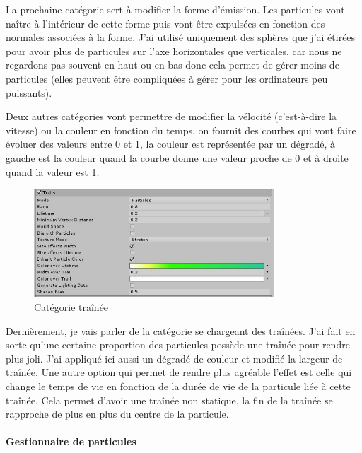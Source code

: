 \documentclass{article}
\begin{document}
La prochaine catégorie sert à modifier la forme d'émission. Les particules vont naître à l'intérieur de cette forme puis vont être expulsées en fonction des normales associées à la forme. J'ai utilisé uniquement des sphères que j'ai étirées pour avoir plus de particules sur l'axe horizontales que verticales, car nous ne regardons pas souvent en haut ou en bas donc cela permet de gérer moins de particules (elles peuvent être compliquées à gérer pour les ordinateurs peu puissants).


Deux autres catégories vont permettre de modifier la vélocité (c'est-à-dire la vitesse) ou la couleur en fonction du temps, on fournit des courbes qui vont faire évoluer des valeurs entre 0 et 1, la couleur est représentée par un dégradé, à gauche est la couleur quand la courbe donne une valeur proche de 0 et à droite quand la valeur est 1.


\begin{figure}[H]
\centering
\includegraphics[width=0.8\textwidth]{cc/particles_trail.JPG}
\caption{Catégorie traînée}
\label{Catégorie traînée}
\end{figure}


Dernièrement, je vais parler de la catégorie se chargeant des traînées. J'ai fait en sorte qu'une certaine proportion des particules possède une traînée pour rendre plus joli. J'ai appliqué ici aussi un dégradé de couleur et modifié la largeur de traînée. Une autre option qui permet de rendre plus agréable l'effet est celle qui change le temps de vie en fonction de la durée de vie de la particule liée à cette traînée. Cela permet d'avoir une traînée non statique, la fin de la traînée se rapproche de plus en plus du centre de la particule.


\paragraph{Gestionnaire de particules}
\end{document}
